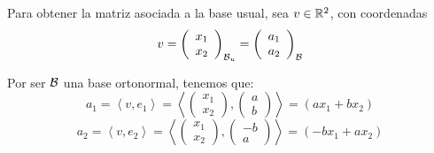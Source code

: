 \begin{ejercicio}
    Para obtener la matriz asociada a la base usual, sea $v\in \mathbb{R}^2$, con coordenadas
    \begin{equation*}
        v=\left(\begin{array}{c}
                 x_1 \\ x_2
            \end{array}\right)_{\mathcal{B}_u}
            =\left(\begin{array}{c}
                 a_1 \\ a_2
            \end{array}\right)_{\mathcal{B}}
    \end{equation*}

    Por ser $\mathcal{B}$ una base ortonormal, tenemos que:
    \begin{equation*}
        a_1 = \left\langle 
            v, e_1\right\rangle
            = \left\langle 
            \left(\begin{array}{c}
                 x_1 \\ x_2
            \end{array}\right),
            \left(\begin{array}{c}
                 a \\ b
            \end{array}\right)
            \right\rangle
            = (ax_1+bx_2)
    \end{equation*}
    \begin{equation*}
        a_2 = \left\langle 
            v, e_2\right\rangle
            = \left\langle 
            \left(\begin{array}{c}
                 x_1 \\ x_2
            \end{array}\right),
            \left(\begin{array}{c}
                 -b \\ a
            \end{array}\right)
            \right\rangle
            = (-bx_1+ax_2)
    \end{equation*}


\end{ejercicio}
